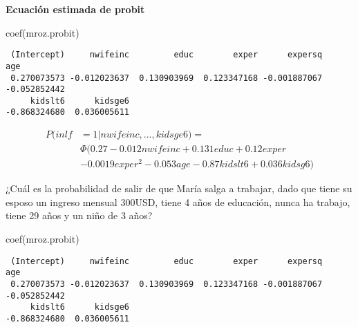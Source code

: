 \documentclass[
  letterpaper,
  DIV=11,
  numbers=noendperiod]{scrreprt}
\newenvironment{Shaded}{\begin{snugshade}}{\end{snugshade}}
\newcommand{\FunctionTok}[1]{\textcolor[rgb]{0.28,0.35,0.67}{#1}}
\newcommand{\NormalTok}[1]{\textcolor[rgb]{0.00,0.23,0.31}{#1}}
\begin{document}
\textbf{Ecuación estimada de probit}

\begin{Shaded}
\begin{Highlighting}[]
\FunctionTok{coef}\NormalTok{(mroz.probit)}
\end{Highlighting}
\end{Shaded}

\begin{verbatim}
 (Intercept)     nwifeinc         educ        exper      expersq          age 
 0.270073573 -0.012023637  0.130903969  0.123347168 -0.001887067 -0.052852442 
     kidslt6      kidsge6 
-0.868324680  0.036005611 
\end{verbatim}

\[
\begin{aligned}
P(inlf&=1|nwifeinc,...,kidsge6)=\\
&\Phi(0.27-0.012nwifeinc+0.131educ+0.12exper\\
&-0.0019exper^2-0.053age-0.87kidslt6+0.036kidsg6)
\end{aligned}
\]

¿Cuál es la probabilidad de salir de que María salga a trabajar, dado
que tiene su esposo un ingreso mensual 300USD, tiene 4 años de
educación, nunca ha trabajo, tiene 29 años y un niño de 3 años?

\begin{Shaded}
\begin{Highlighting}[]
\FunctionTok{coef}\NormalTok{(mroz.probit)}
\end{Highlighting}
\end{Shaded}

\begin{verbatim}
 (Intercept)     nwifeinc         educ        exper      expersq          age 
 0.270073573 -0.012023637  0.130903969  0.123347168 -0.001887067 -0.052852442 
     kidslt6      kidsge6 
-0.868324680  0.036005611 
\end{verbatim}
\end{document}
